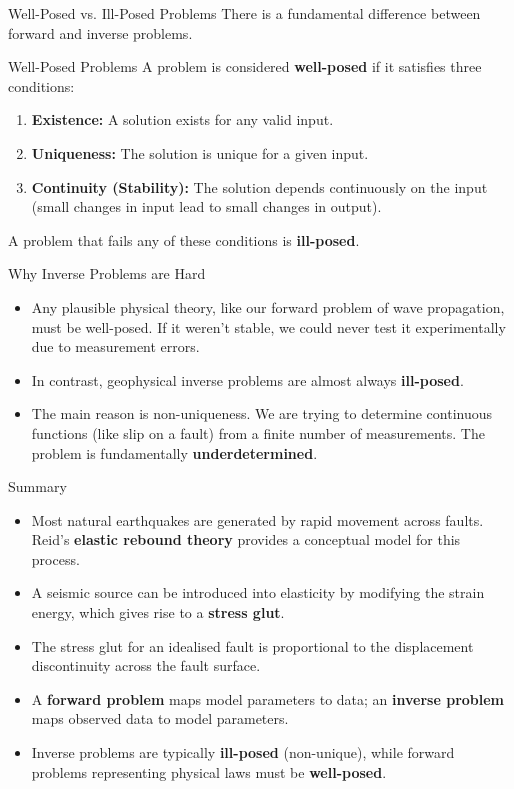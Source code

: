 \documentclass{beamer}
\begin{document}
\begin{frame}{Well-Posed vs. Ill-Posed Problems}
    There is a fundamental difference between forward and inverse problems.
    \begin{alertblock}{Well-Posed Problems}
        A problem is considered \textbf{well-posed} if it satisfies three conditions:
        \begin{enumerate}
            \item \textbf{Existence:} A solution exists for any valid input.
            \item \textbf{Uniqueness:} The solution is unique for a given input.
            \item \textbf{Continuity (Stability):} The solution depends continuously on the input (small changes in input lead to small changes in output).
        \end{enumerate}
        A problem that fails any of these conditions is \textbf{ill-posed}.
    \end{alertblock}
\end{frame}

\begin{frame}{Why Inverse Problems are Hard}
    \begin{itemize}
        \item Any plausible physical theory, like our forward problem of wave propagation, must be well-posed. If it weren't stable, we could never test it experimentally due to measurement errors.
        \pause
        \item In contrast, geophysical inverse problems are almost always \textbf{ill-posed}.
        \pause
        \item The main reason is non-uniqueness. We are trying to determine continuous functions (like slip on a fault) from a finite number of measurements. The problem is fundamentally \textbf{underdetermined}.
    \end{itemize}
\end{frame}


\begin{frame}{Summary}
    \begin{itemize}
        \item Most natural earthquakes are generated by rapid movement across faults. Reid's \textbf{elastic rebound theory} provides a conceptual model for this process.
        \pause
        \item A seismic source can be introduced into elasticity by modifying the strain energy, which gives rise to a \textbf{stress glut}.
        \pause
        \item The stress glut for an idealised fault is proportional to the displacement discontinuity across the fault surface.
        \pause
        \item A \textbf{forward problem} maps model parameters to data; an \textbf{inverse problem} maps observed data to model parameters.
        \pause
        \item Inverse problems are typically \textbf{ill-posed} (non-unique), while forward problems representing physical laws must be \textbf{well-posed}.
    \end{itemize}
\end{frame}
\end{document}
